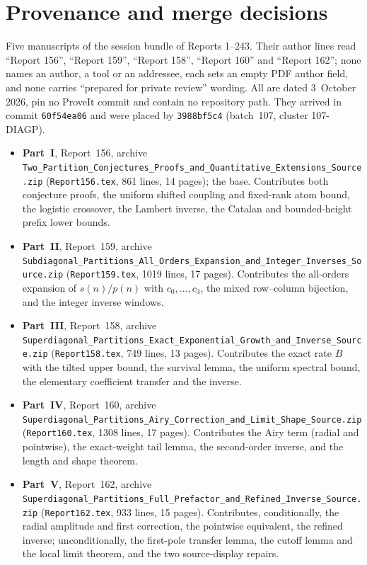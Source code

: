 \documentclass[11pt,letterpaper]{article}
\numberwithin{equation}{section}
\theoremstyle{remark}\newtheorem{remark}[theorem]{Remark}
\newcommand{\file}[1]{\nolinkurl{#1}}
\begin{document}
\section*{Provenance and merge decisions}\label{dgp:sec:provenance}
Five manuscripts of the session bundle of Reports 1--243. Their author lines read ``Report 156'', ``Report 159'', ``Report 158'', ``Report 160'' and ``Report 162''; none names an author, a tool or an addressee, each sets an empty PDF author field, and none carries ``prepared for private review'' wording. All are dated 3~October 2026, pin no ProveIt commit and contain no repository path. They arrived in commit \texttt{60f54ea06} and were placed by \texttt{3988bf5c4} (batch~107, cluster 107-DIAGP).
\begin{itemize}
\item \textbf{Part~I}, Report~156, archive \file{Two_Partition_Conjectures_Proofs_and_Quantitative_Extensions_Source.zip} (\file{Report156.tex}, 861 lines, 14 pages); the base. Contributes both conjecture proofs, the uniform shifted coupling and fixed-rank atom bound, the logistic crossover, the Lambert inverse, the Catalan and bounded-height prefix lower bounds.
\item \textbf{Part~II}, Report~159, archive \file{Subdiagonal_Partitions_All_Orders_Expansion_and_Integer_Inverses_Source.zip} (\file{Report159.tex}, 1019 lines, 17 pages). Contributes the all-orders expansion of $s(n)/p(n)$ with $c_0,\dots,c_3$, the mixed row--column bijection, and the integer inverse windows.
\item \textbf{Part~III}, Report~158, archive \file{Superdiagonal_Partitions_Exact_Exponential_Growth_and_Inverse_Source.zip} (\file{Report158.tex}, 749 lines, 13 pages). Contributes the exact rate $B$ with the tilted upper bound, the survival lemma, the uniform spectral bound, the elementary coefficient transfer and the inverse.
\item \textbf{Part~IV}, Report~160, archive \file{Superdiagonal_Partitions_Airy_Correction_and_Limit_Shape_Source.zip} (\file{Report160.tex}, 1308 lines, 17 pages). Contributes the Airy term (radial and pointwise), the exact-weight tail lemma, the second-order inverse, and the length and shape theorem.
\item \textbf{Part~V}, Report~162, archive \file{Superdiagonal_Partitions_Full_Prefactor_and_Refined_Inverse_Source.zip} (\file{Report162.tex}, 933 lines, 15 pages). Contributes, conditionally, the radial amplitude and first correction, the pointwise equivalent, the refined inverse; unconditionally, the first-pole transfer lemma, the cutoff lemma and the local limit theorem, and the two source-display repairs.
\end{itemize}
\end{document}
